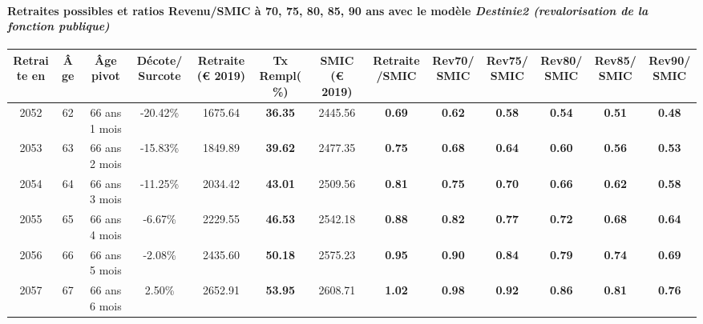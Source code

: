 \paragraph{Retraites possibles et ratios Revenu/SMIC à 70, 75, 80, 85, 90 ans avec le modèle \emph{Destinie2 (revalorisation de la fonction publique)}}  
 
{ \scriptsize \begin{center} 
\begin{tabular}[htb]{|c|c||c|c||c|c||c||c|c|c|c|c|c|} 
\hline 
 Retraite en &  Âge &  Âge pivot &  Décote/Surcote &  Retraite (\euro{} 2019) &  Tx Rempl(\%) &  SMIC (\euro{} 2019) &  Retraite/SMIC &  Rev70/SMIC &  Rev75/SMIC &  Rev80/SMIC &  Rev85/SMIC &  Rev90/SMIC \\ 
\hline \hline 
 2052 &  62 &  66 ans 1 mois &  -20.42\% &  1675.64 &  {\bf 36.35} &  2445.56 &  {\bf {\color{red} 0.69}} &  {\bf {\color{red} 0.62}} &  {\bf {\color{red} 0.58}} &  {\bf {\color{red} 0.54}} &  {\bf {\color{red} 0.51}} &  {\bf {\color{red} 0.48}} \\ 
\hline 
 2053 &  63 &  66 ans 2 mois &  -15.83\% &  1849.89 &  {\bf 39.62} &  2477.35 &  {\bf {\color{red} 0.75}} &  {\bf {\color{red} 0.68}} &  {\bf {\color{red} 0.64}} &  {\bf {\color{red} 0.60}} &  {\bf {\color{red} 0.56}} &  {\bf {\color{red} 0.53}} \\ 
\hline 
 2054 &  64 &  66 ans 3 mois &  -11.25\% &  2034.42 &  {\bf 43.01} &  2509.56 &  {\bf {\color{red} 0.81}} &  {\bf {\color{red} 0.75}} &  {\bf {\color{red} 0.70}} &  {\bf {\color{red} 0.66}} &  {\bf {\color{red} 0.62}} &  {\bf {\color{red} 0.58}} \\ 
\hline 
 2055 &  65 &  66 ans 4 mois &  -6.67\% &  2229.55 &  {\bf 46.53} &  2542.18 &  {\bf {\color{red} 0.88}} &  {\bf {\color{red} 0.82}} &  {\bf {\color{red} 0.77}} &  {\bf {\color{red} 0.72}} &  {\bf {\color{red} 0.68}} &  {\bf {\color{red} 0.64}} \\ 
\hline 
 2056 &  66 &  66 ans 5 mois &  -2.08\% &  2435.60 &  {\bf 50.18} &  2575.23 &  {\bf {\color{red} 0.95}} &  {\bf {\color{red} 0.90}} &  {\bf {\color{red} 0.84}} &  {\bf {\color{red} 0.79}} &  {\bf {\color{red} 0.74}} &  {\bf {\color{red} 0.69}} \\ 
\hline 
 2057 &  67 &  66 ans 6 mois &  2.50\% &  2652.91 &  {\bf 53.95} &  2608.71 &  {\bf 1.02} &  {\bf {\color{red} 0.98}} &  {\bf {\color{red} 0.92}} &  {\bf {\color{red} 0.86}} &  {\bf {\color{red} 0.81}} &  {\bf {\color{red} 0.76}} \\ 
\hline 
\hline 
\end{tabular} 
\end{center} } 

